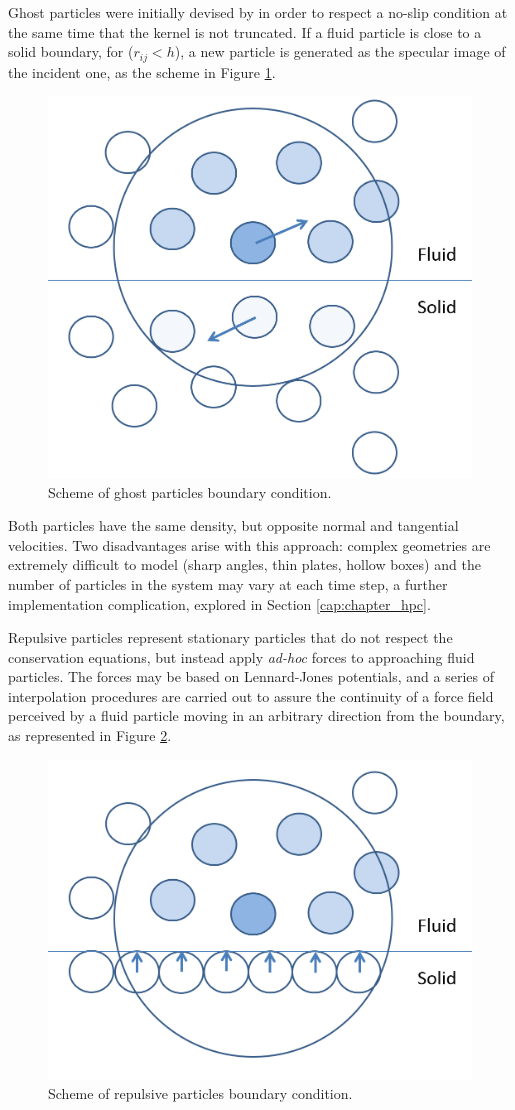 Ghost particles were initially devised by \cite{Randles-1996} in order to respect a no-slip condition at the same time that the kernel is not truncated. If a fluid particle is close to a solid boundary, for ($r_{ij}<h$), a new particle is generated as the specular image of the incident one, as the scheme in Figure \ref{fig:Ghost_particles}. 
%
\begin{figure}[H]
	\centering
	\includegraphics[width=0.45\linewidth]{Figures/3.Chapter/Ghost_particles}
	\caption{Scheme of ghost particles boundary condition.}
	\label{fig:Ghost_particles} 
\end{figure}
%

Both particles have the same density, but opposite normal and tangential velocities. Two disadvantages arise with this approach: complex geometries are extremely difficult to model (sharp angles, thin plates, hollow boxes) and the number of particles in the system may vary at each time step, a further implementation complication, explored in Section \ref{cap:chapter_hpc}. 


Repulsive particles \citep{Monaghan-1999} represent stationary particles that do not respect the conservation equations, but instead apply \textit{ad-hoc} forces to approaching fluid particles. The forces may be based on Lennard-Jones potentials, and a series of interpolation procedures are carried out to assure the continuity of a force field perceived by a fluid particle moving in an arbitrary direction from the boundary, as represented in Figure \ref{fig:repulsive_particles}.
%
\begin{figure}[H]
	\centering
	\includegraphics[width=0.45\linewidth]{Figures/3.Chapter/Repulsive_particles}
	\caption{Scheme of repulsive particles boundary condition.}
	\label{fig:repulsive_particles} 
\end{figure}
%

